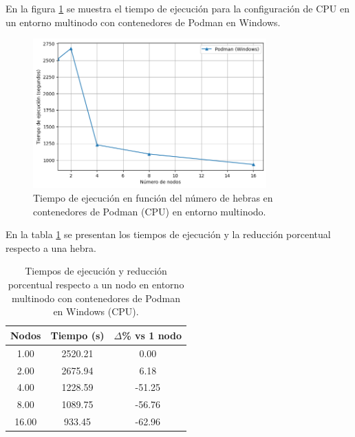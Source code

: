 En la figura \ref{fig:multi-node_windows_podman_time} se muestra el tiempo de ejecución para la configuración de CPU en un entorno multinodo con contenedores de Podman en Windows.

\begin{figure}[H]
    \centering
    \includegraphics[width=0.8\textwidth]{imagenes/cap5/multi-node_windows_podman_time.png}
    \caption{Tiempo de ejecución en función del número de hebras en contenedores de Podman (CPU) en entorno multinodo.}
    \label{fig:multi-node_windows_podman_time}
\end{figure}

En la tabla \ref{tab:multi-node_windows_podman} se presentan los tiempos de ejecución y la reducción porcentual respecto a una hebra.

\begin{table}[ht]
    \centering
    \begin{tabular}{|c|c|c|}
        \hline
        \textbf{Nodos} & \textbf{Tiempo (s)} & \textbf{$\Delta$\% vs 1 nodo} \\
        \hline
        1.00           & 2520.21             & 0.00                          \\
        2.00           & 2675.94             & 6.18                          \\
        4.00           & 1228.59             & -51.25                        \\
        8.00           & 1089.75             & -56.76                        \\
        16.00          & 933.45              & -62.96                        \\
        \hline
    \end{tabular}
    \caption{Tiempos de ejecución y reducción porcentual respecto a un nodo en entorno multinodo con contenedores de Podman en Windows (CPU).}
    \label{tab:multi-node_windows_podman}
\end{table}

